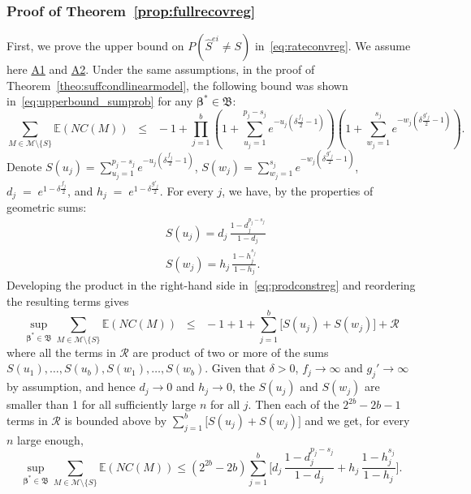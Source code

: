 \documentclass[
  12pt]{article}
\newcommand{\piotr}[1]{{\small{\color{red} \sf $\clubsuit$ Piotr: #1}}}
\newcommand{\E}{\mathbb{E}}
\newcommand{\M}{\mathcal{M}}
\newcommand{\bbeta}{\boldsymbol{\beta}}
\newcommand{\bB}{\mathfrak{B}}
\begin{document}
 \subsubsection{Proof of Theorem~\ref{prop:fullrecovreg}}

First, we prove the upper bound on $P(\hat{S}^{ei} \neq S)$ in~\eqref{eq:rateconvreg}. We assume here \hyperlink{lab:A1}{A1} and \hyperlink{lab:A2}{A2}. Under the same assumptions, in the proof of Theorem~\ref{theo:suffcondlinearmodel}, the following bound was shown in~\eqref{eq:upperbound_sumprob} for any $\bbeta^*\in \bB$:
\begin{equation}\label{eq:prodconstreg}
 \sum_{M \in \M\setminus \{S\}} \E\left(NC(M)\right)
    \;\;\leq\;\; - 1+\prod_{j=1}^b\left(1+\sum_{u_j=1}^{p_j-s_j}e^{-u_j\left(\delta \tfrac{f_j}{2}-1\right)}\right)\left(1+
    \sum_{w_j=1}^{s_j}    e^{-w_j\left(\delta \tfrac{g'_j}{2}-1\right)}\right) .
\end{equation}
Denote $S(u_j)=\sum_{u_j=1}^{p_j-s_j}e^{-u_j\left(\delta \tfrac{f_j}{2}-1\right)}$,  $S(w_j)=\sum_{w_j=1}^{s_j}    e^{-w_j\left(\delta \tfrac{g'_j}{2}-1\right)}$, $d_j\;=\;e^{1-\delta \tfrac{f_j}{2}}$, and $h_j\;=\;e^{1-\delta \tfrac{g'_j}{2}}$. For every $j$, we have, by the properties of geometric sums:
\begin{align*}
    &S(u_j)
    =d_j\,\frac{1-d_j^{p_j-s_j}}{1-d_j} \\
    &S(w_j) =h_j\,\frac{1-h_j^{s_j}}{1-h_j}.
\end{align*}
Developing the product in the right-hand side in~\eqref{eq:prodconstreg} and reordering the resulting terms gives
$$\sup_{\bbeta^*\in \bB}\sum_{M \in \M\setminus \{S\}} \E\left(NC(M)\right)\;\;\leq\;\;-1+1+\sum_{j=1}^b\big[S(u_j)+S(w_j)\big]+\mathcal{R}$$
where all the terms in $\mathcal{R}$ are product of two or more of the sums $S(u_1),\ldots,S(u_b),S(w_1),\ldots,S(w_b)$. Given that $\delta>0$, $f_j \to \infty$ and $g_j' \to \infty$ by assumption, and hence $d_j \to 0$ and $h_j \to 0$, the $S(u_j)$ and $S(w_j)$ are smaller than 1 for all sufficiently large $n$ for all $j$. Then each of the $2^{2b}-2b-1$ terms in $\mathcal{R}$ is bounded above by $\sum_{j=1}^b\big[S(u_j)+S(w_j)\big]$ and we get, for every $n$ large enough,
 \begin{equation} \label{eq:fierg}
 \sup_{\bbeta^*\in \bB}\sum_{M \in \M\setminus \{S\}} \E\left(NC(M)\right)
 \leq (2^{2b}-2b)\sum_{j=1}^b \bigg[d_j\,\frac{1-d_j^{p_j-s_j}}{1-d_j}+ h_j\,\frac{1-h_j^{s_j}}{1-h_j}\bigg ]. \end{equation} 
\end{document}
